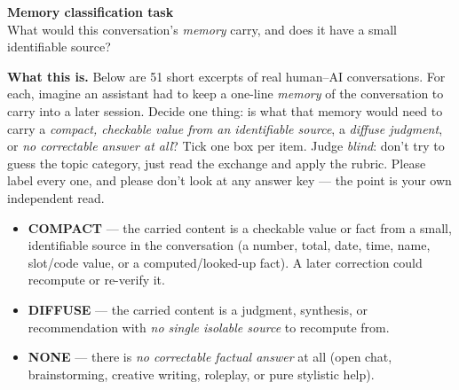 \documentclass[10pt]{article}
\newcommand{\C}{\textcolor{cbox}{\textbf{COMPACT}}}
\newcommand{\D}{\textcolor{dbox}{\textbf{DIFFUSE}}}
\newcommand{\N}{\textcolor{nbox}{\textbf{NONE}}}
\begin{document}
\begin{Form}
\begin{center}{\LARGE\textbf{Memory classification task}}\\[4pt]
{\large What would this conversation's \emph{memory} carry, and does it have a small identifiable source?}\end{center}
\vspace{6pt}
\vspace{6pt}

\textbf{What this is.} Below are 51 short excerpts of real human--AI conversations. For each, imagine an
assistant had to keep a one-line \emph{memory} of the conversation to carry into a later session. Decide
one thing: is what that memory would need to carry a \emph{compact, checkable value from an identifiable
source}, a \emph{diffuse judgment}, or \emph{no correctable answer at all}? Tick one box per item. Judge
\emph{blind}: don't try to guess the topic category, just read the exchange and apply the rubric. Please
label every one, and please don't look at any answer key --- the point is your own independent read.

\medskip
\begin{itemize}\setlength{\itemsep}{4pt}
\item \C{} --- the carried content is a checkable value or fact from a small, identifiable source in the
conversation (a number, total, date, time, name, slot/code value, or a computed/looked-up fact). A later
correction could recompute or re-verify it.
\item \D{} --- the carried content is a judgment, synthesis, or recommendation with \emph{no single
isolable source} to recompute from.
\item \N{} --- there is \emph{no correctable factual answer} at all (open chat, brainstorming, creative
writing, roleplay, or pure stylistic help).
\end{itemize}
\medskip


\end{Form}
\end{document}

